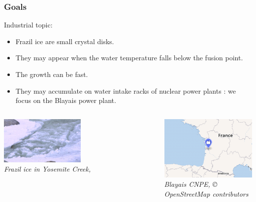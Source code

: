 \documentclass[10pt]{beamer}
\begin{document}
\begin{frame}
\frametitle{Goals}

Industrial topic:
\begin{itemize}
\item Frazil ice are small crystal disks. 
\item They may appear when the water temperature falls below the fusion point. 
\item The growth can be fast. 
\item They may accumulate on water intake racks of nuclear power plants 
\cite{souille2020multi}: we focus on the Blayais power plant. 
\end{itemize}

\begin{columns}
\includegraphics[height=0.45\textwidth]{figures/Frazil_ice_in_Yosemite_Creek.png} \\
\emph{Frazil ice in Yosemite Creek, \cite{wikiFrazil}}

\begin{center}
\includegraphics[height=0.45\textwidth]{figures/Blayais-CNPE.PNG} \\
\emph{Blayais CNPE, © OpenStreetMap contributors}
\end{center}
\end{columns}

\end{frame}
\end{document}

